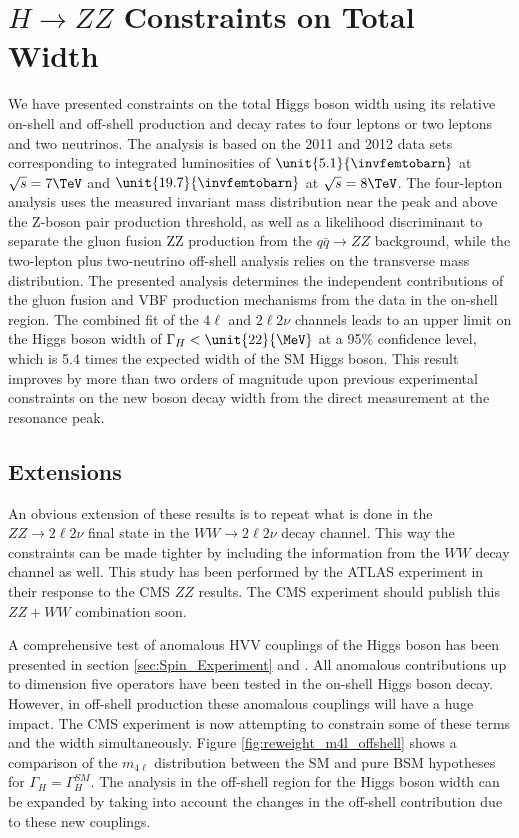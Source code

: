 \section{$H \to ZZ$ Constraints on Total Width}
\label{sec:Summary_TotalWidth}


We have presented constraints on the total Higgs boson width using its relative
on-shell and off-shell production and decay rates to four leptons or two leptons and two
neutrinos. The analysis is based on the 2011 and 2012 data sets corresponding to integrated
luminosities of $\unit{5.1}{\invfemtobarn}$ at $\sqrt{s} = 7\TeV$ and  $\unit{19.7}{\invfemtobarn}$ at $\sqrt{s} = 8\TeV$.
The four-lepton analysis uses the measured invariant mass distribution near the peak and
above the Z-boson pair production threshold, as well as a likelihood discriminant to separate
the gluon fusion ZZ production from the $q\bar{q} \to ZZ$ background,
while the two-lepton plus two-neutrino off-shell analysis relies on the transverse mass distribution.
The presented analysis determines the independent contributions of the gluon fusion and VBF production
mechanisms from the data in the on-shell region. 
The combined fit of the $4\ell$ and $2\ell 2\nu$ channels leads to an upper limit on the Higgs boson
width of $\Gamma_{H} < \unit{22}{\MeV}$ at a 95\% confidence level, which is 5.4 times the expected
width of the SM Higgs boson. This result improves by more than two orders of magnitude upon previous
experimental constraints on the new boson decay width from the direct measurement at the resonance peak.

\subsection{Extensions}

An obvious extension of these results is to repeat what is done in the $ZZ \to 2\ell2\nu$ final state in the $WW \to 2\ell2\nu$ decay channel. This way the constraints can be made tighter by including the information from the $WW$ decay channel as well. This study has been performed by the ATLAS experiment \cite{Aad:2015xua} in their response to the CMS $ZZ$ results. The CMS experiment should publish this $ZZ+WW$ combination soon.

A comprehensive test of anomalous HVV couplings of the Higgs boson has been presented in section \ref{sec:Spin_Experiment} and \cite{Khachatryan:2014kca}. All anomalous contributions up to dimension
five operators have been tested in the on-shell Higgs boson decay. However, in off-shell production these anomalous couplings will have a huge impact. The CMS experiment is now attempting to constrain some of these terms and the width simultaneously. Figure \ref{fig:reweight_m4l_offshell} shows a comparison of the $m_{4\ell}$ distribution between the SM and pure BSM hypotheses for $\Gamma_{H}=\Gamma_{H}^{SM}$. The analysis in the off-shell region for the Higgs boson width can be expanded by taking into account the changes in the off-shell contribution due to these new couplings.

